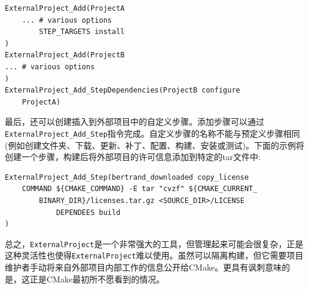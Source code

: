 \begin{lstlisting}[style=styleCMake]
ExternalProject_Add(ProjectA
	... # various options
		STEP_TARGETS install
)
ExternalProject_Add(ProjectB
... # various options
)
ExternalProject_Add_StepDependencies(ProjectB configure
	ProjectA)
\end{lstlisting}

最后，还可以创建插入到外部项目中的自定义步骤。添加步骤可以通过\texttt{ExternalProject\_Add\_Step}指令完成。自定义步骤的名称不能与预定义步骤相同(例如创建文件夹、下载、更新、补丁、配置、构建、安装或测试)。下面的示例将创建一个步骤，构建后将外部项目的许可信息添加到特定的tar文件中:

\begin{lstlisting}[style=styleCMake]
ExternalProject_Add_Step(bertrand_downloaded copy_license
	COMMAND ${CMAKE_COMMAND} -E tar "cvzf" ${CMAKE_CURRENT_
		BINARY_DIR}/licenses.tar.gz <SOURCE_DIR>/LICENSE
			DEPENDEES build
)
\end{lstlisting}

总之，\texttt{ExternalProject}是一个非常强大的工具，但管理起来可能会很复杂，正是这种灵活性也使得\texttt{ExternalProject}难以使用。虽然可以隔离构建，但它需要项目维护者手动将来自外部项目内部工作的信息公开给CMake。更具有讽刺意味的是，这正是CMake最初所不愿看到的情况。











